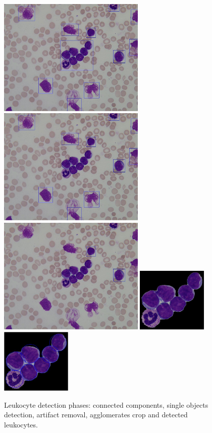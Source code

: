 \documentclass[final,a4paper,12pt,english]{UnicaPhdThesis3}
\begin{document}
{\begin{figure}[h]
	\centering
	\includegraphics[width=7cm]{images/2016_1_mva/DetectedIm001_1}
	\includegraphics[width=7cm]{images/2016_1_mva/DetectedIm001_1small}
	\includegraphics[width=7cm]{images/2016_1_mva/DetectedIm001_1solid}
	\includegraphics[width=3.36cm]{images/2016_1_mva/agglomerateclosed}
	\includegraphics[width=3.36cm]{images/2016_1_mva/agglomeratehough}
	\caption{\label{fig:ex9}Leukocyte detection phases: connected components, single objects detection, artifact removal, agglomerates crop and detected leukocytes.}
\end{figure}

}
\end{document}
